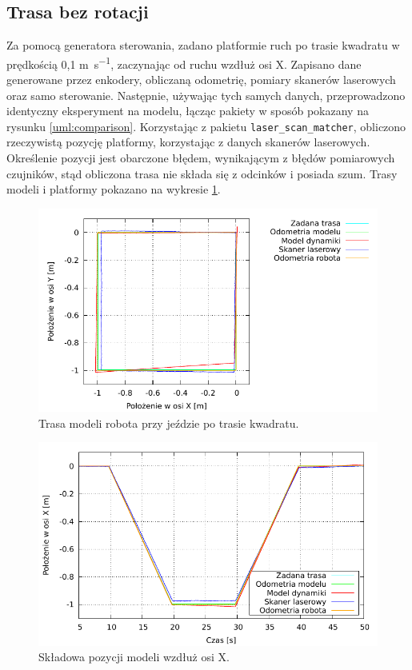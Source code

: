 	\subsection{Trasa bez rotacji}
		\label{sec:test_velmobil}
		Za pomocą generatora sterowania, zadano platformie ruch po trasie kwadratu w prędkością 0,1 \si{\metre\per\second}, zaczynając od ruchu wzdłuż osi X.
		Zapisano dane generowane przez enkodery, obliczaną odometrię, pomiary skanerów laserowych oraz samo sterowanie.
		Następnie, używając tych samych danych, przeprowadzono identyczny eksperyment na modelu, łącząc pakiety w sposób pokazany na rysunku \ref{uml:comparison}.
		Korzystając z pakietu \texttt{laser\_scan\_matcher}, obliczono rzeczywistą pozycję platformy, korzystając z danych skanerów laserowych.
		Określenie pozycji jest obarczone błędem, wynikającym
		z błędów pomiarowych czujników, stąd obliczona trasa nie składa się z odcinków i posiada szum.
		Trasy modeli i platformy pokazano na wykresie \ref{plot:velmobil_xy}.
		
		\begin{figure}[H]
			\centering
			\includegraphics[width=\textwidth]{plots/velmobil_xy.pdf}
				\caption{Trasa modeli robota przy jeździe po trasie kwadratu.}
			\label{plot:velmobil_xy}
		\end{figure}
		
		\begin{figure}[H]
			\centering
			\includegraphics[width=\textwidth]{plots/velmobil_xt.pdf}
				\caption{Składowa pozycji modeli wzdłuż osi X.}
			\label{plot:velmobil_xt}
		\end{figure}
		
